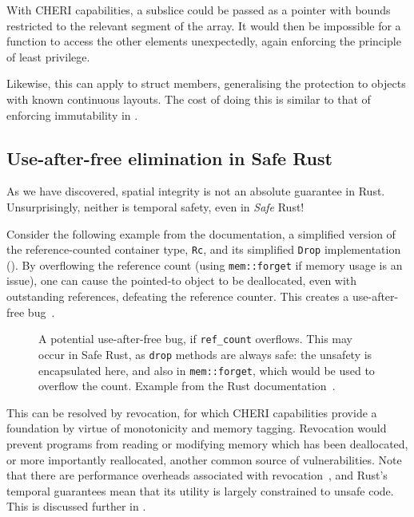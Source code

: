\documentclass[dissertation.tex]{subfiles}
\begin{document}
With CHERI capabilities, a subslice could be passed as a pointer with
bounds restricted to the relevant segment of the array.
It would then be impossible for a function to access the other elements
unexpectedly, again enforcing the principle of least privilege.

Likewise, this can apply to struct members, generalising the protection
to objects with known continuous layouts.
The cost of doing this is similar to that of enforcing immutability in
.


\subsection{Use-after-free elimination in Safe Rust}
\label{sec:eval-rust-use-after-free}

As we have discovered, spatial integrity is not an absolute guarantee in
Rust.
Unsurprisingly, neither is temporal safety, even in \emph{Safe} Rust!

Consider the following example from the documentation, a simplified
version of the reference-counted container type, \texttt{Rc}, and its
simplified \texttt{Drop} implementation ().
By overflowing the reference count (using \texttt{mem::forget} if memory
usage is an issue), one can cause the pointed-to object to be
deallocated, even with outstanding references, defeating the reference
counter.
This creates a use-after-free bug~\cite{rust-nomicon-rc-leak}.

\begin{figure}[ht]
    
    \caption{
        A potential use-after-free bug, if \texttt{ref\_count}
        overflows.
        This may occur in Safe Rust, as \texttt{drop} methods are always
        safe: the unsafety is encapsulated here, and also in
        \texttt{mem::forget}, which would be used to overflow the count.
        Example from the Rust documentation~\cite{rust-nomicon-rc-leak}.
    }
    \label{lst:eval-rust-rc-drop}
\end{figure}

This can be resolved by revocation, for which CHERI capabilities provide
a foundation by virtue of monotonicity and memory tagging.
Revocation would prevent programs from reading or modifying memory which
has been deallocated, or more importantly reallocated, another common
source of vulnerabilities.
Note that there are performance overheads associated with
revocation~\cite{cheri-v6}, and Rust's temporal guarantees mean that its
utility is largely constrained to unsafe code.
This is discussed further in .
\end{document}

